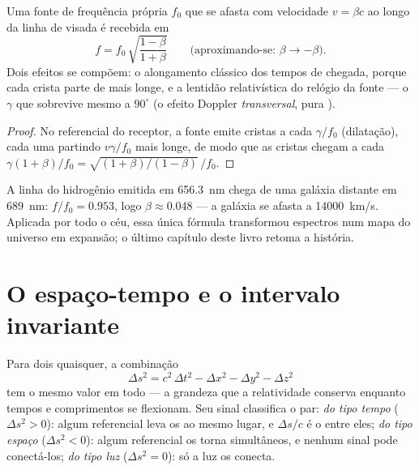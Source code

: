 \begin{proposition}\label{prop:b3:relativistic-kinematics:doppler}
Uma fonte de frequência própria $f_0$ que se afasta com velocidade
$v = \beta c$ ao longo da linha de visada é recebida em
\[
f = f_0\,\sqrt{\frac{1 - \beta}{1 + \beta}}
\qquad
\text{(aproximando-se: } \beta \to -\beta\text{)} .
\]
Dois efeitos se compõem: o alongamento clássico dos tempos de chegada,
porque cada crista parte de mais longe, e a lentidão relativística do
relógio da fonte --- o $\gamma$ que sobrevive mesmo a $90^\circ$ (o
efeito Doppler \emph{transversal}, pura ).
\end{proposition}

\begin{proof}
No referencial do receptor, a fonte emite cristas a cada
$\gamma/f_0$ (dilatação), cada uma partindo $v\gamma/f_0$ mais longe, de
modo que as cristas chegam a cada $\gamma(1 + \beta)/f_0 = \sqrt{(1+\beta)/
(1-\beta)}\,/f_0$.
\end{proof}

\begin{example}\label{ex:b3:relativistic-kinematics:redshift}
A linha do hidrogênio emitida em \qty{656.3}{nm} chega de uma galáxia
distante em \qty{689}{nm}: $f/f_0 = 0.953$, logo $\beta \approx 0.048$
--- a galáxia se afasta a \qty{14000}{km/s}. Aplicada por todo o céu,
essa única fórmula transformou espectros num mapa do universo em
expansão; o último capítulo deste livro retoma a história.
\end{example}

\section{O espaço-tempo e o intervalo invariante}

\begin{theorem}\label{thm:b3:relativistic-kinematics:interval}
Para dois  quaisquer, a combinação
\[
\Delta s^2 = c^2\,\Delta t^2 - \Delta x^2 - \Delta y^2 - \Delta z^2
\]
tem o mesmo valor em todo  --- a grandeza que a
relatividade conserva enquanto tempos e comprimentos se flexionam. Seu
sinal classifica o par: \emph{do tipo tempo} ($\Delta s^2 > 0$): algum
referencial leva os  ao mesmo lugar, e $\Delta s/c$ é o  entre eles; \emph{do tipo espaço} ($\Delta s^2 < 0$): algum
referencial os torna simultâneos, e nenhum sinal pode conectá-los;
\emph{do tipo luz} ($\Delta s^2 = 0$): só a luz os conecta.
\end{theorem}

